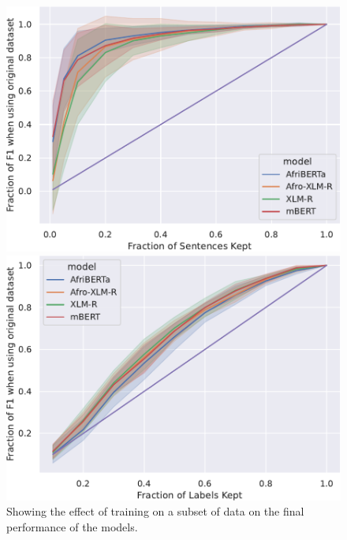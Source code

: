 \documentclass{article}
\begin{document}
\begin{figure}
    \centering
    \begin{minipage}[t]{0.33\linewidth}
        \captionsetup{width=.8\linewidth}
        \includegraphics[width=1\linewidth]{images/global_cap_sentences.pdf}
        \caption{Showing the effect of training on a subset of data on the final performance of the models.}
        \label{fig:global_cap_sentences}
    \end{minipage}
    \begin{minipage}[t]{0.33\linewidth}
    \captionsetup{width=.8\linewidth}
        \centering
        \includegraphics[width=1\linewidth]{images/global_cap_labels.pdf}

\end{minipage}
\end{figure}
\end{document}
